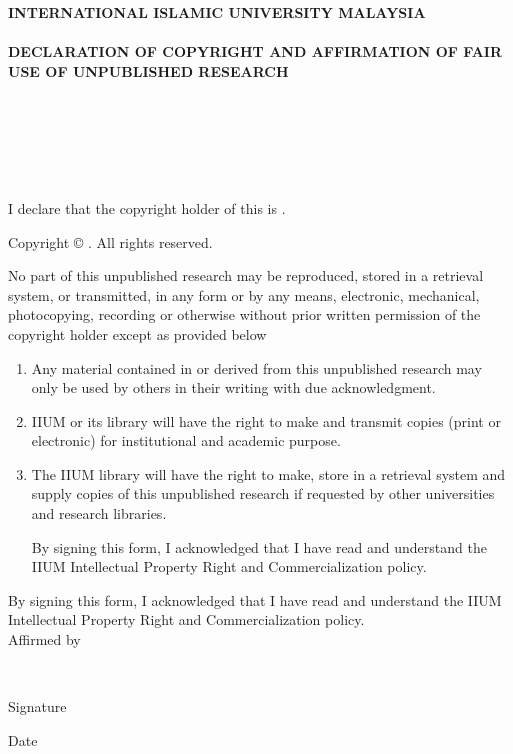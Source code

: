 \documentclass[12pt, a4paper, oneside, showtrims]{memoir}
\begin{document}
\thispagestyle{empty}

\begin{center}
{\fontsize{14bp}{16bp}\selectfont
\textbf{\MakeUppercase{International Islamic University Malaysia}}\\~\\
\textbf{\MakeUppercase{Declaration of Copyright and Affirmation of Fair Use of 
Unpublished Research}}\\~\\
\textbf{\MakeUppercase{\myTitle}}\\
\ifdefined\mySubtitle
\textbf{\MakeUppercase{\mySubtitle}}\\~\\
\else
\\~\\
\fi}
\noindent I declare that the copyright holder of this \myDocument is 
\myName.\\
\end{center}

\begin{center}
{\fontsize{10bp}{12bp}\selectfont
\noindent Copyright \copyright{} \myYear \myName. All rights reserved.}\\
\end{center}

\noindent No part of this unpublished research may be reproduced, stored in a 
retrieval
system, or transmitted, in any form or by any means, electronic, mechanical,
photocopying, recording or otherwise without prior written permission of the
copyright holder except as provided below

\begin{enumerate}
\item Any material contained in or derived from this unpublished research
may only be used by others in their writing with due acknowledgment.

\item IIUM or its library will have the right to make and transmit copies
(print or electronic) for institutional and academic purpose.

\item The IIUM library will have the right to make, store in a retrieval system
and supply copies of this unpublished research if requested by other
universities and research libraries.

By signing this form, I acknowledged that I have read and understand the
IIUM Intellectual Property Right and Commercialization policy.
\end{enumerate}

\noindent By signing this form, I acknowledged that I have read and understand 
the
IIUM Intellectual Property Right and Commercialization policy.\\[48pt]

\noindent Affirmed by \myName\\

\vfill

\noindent \makebox[2in]{\dotfill} \hfill \makebox[2in]{\dotfill}\\
\parbox{2in}{\centering Signature} \hfill \parbox{2in}{\centering Date}

\vfill
\end{document}
